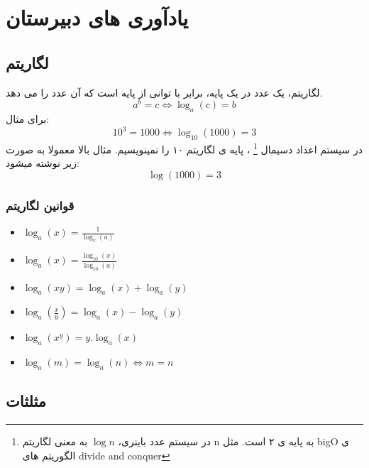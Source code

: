 \documentclass[12pt, a4paper, oneside]{article}
\begin{document}
\tableofcontents
\newpage
\newcommand\deltavec[1]{\vec{\Delta{#1}}}
\newcommand\undersetrtl[2]{${\underset{#1}{#2}}$}
\newcommand\lxa[1]{\lim_{x \to a} #1}
\newcommand\linf[1]{\lim_{x \to \infty} #1}
\newcommand\Lone[0]{\lxa f(x)}
\newcommand\Ltwo[0]{\lxa g(x)}
\section{یادآوری های دبیرستان}
\subsection{لگاریتم}
\label{subsec:log}
لگاریتم، یک عدد در یک پایه، برابر با توانی از پایه است که آن عدد را می دهد.
\[a^b = c \Leftrightarrow \log_a (c) = b\]
برای مثال: 
\[10^3 = 1000 \Leftrightarrow \log_{10} (1000) = 3\]
در سیستم اعداد دسیمال
\footnote{
    در سیستم عدد باینری، 
    $\log{n}$
    به معنی لگاریتم n به پایه ی ۲ است.
    مثل 
    bigO ی 
    الگوریتم های
    divide and conquer
}
    ، پایه ی لگاریتم ۱۰ را نمینویسیم. مثال بالا معمولا به صورت زیر نوشته میشود: 
    \[\log (1000) = 3\]
\subsubsection{قوانین لگاریتم}

\noindent
\begin{latin}
\begin{itemize}
    \item { $\log_a(x) = \frac{ 1 }{ \log_x(a) }$ }
    \item { $\log_a(x) = \frac{ \log_{10}(x) }{ \log_{10}(a) }$ }
    \item { $\log_a(xy) = \log_a (x) + \log_a(y)$ }
    \item { $\log_a(\frac{x}{y}) = \log_a (x) - \log_a(y)$ }
    \item { $\log_a(x^y) = y.\log_a(x)$ }
    \item { $\log_a (m) = \log_a(n) \Leftrightarrow m = n$ }
\end{itemize}
\end{latin}

\subsection{مثلثات}
\end{document}
